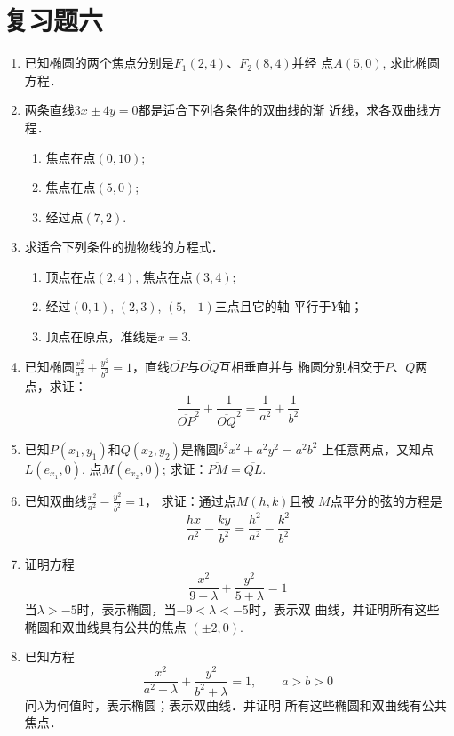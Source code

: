 \section*{复习题六}

\begin{enumerate}
    \item 已知椭圆的两个焦点分别是$F_1(2,4)$、$F_2(8,4)$并经
    点$A(5,0)$, 求此椭圆方程．
    \item 两条直线$3x\pm 4y=0$都是适合下列各条件的双曲线的渐
    近线，求各双曲线方程．
\begin{enumerate}
\item 焦点在点$(0,10)$;
\item 焦点在点$(5,0)$;
\item 经过点$(7,2)$.
\end{enumerate}

    \item 求适合下列条件的抛物线的方程式．
\begin{enumerate}
    \item 顶点在点$(2,4)$, 焦点在点$(3,4)$;
    \item 经过$(0,1)$, $(2,3)$, $(5,-1)$三点且它的轴
    平行于$Y$轴；
\item     顶点在原点，准线是$x=3$.
\end{enumerate}

\item    已知椭圆$\frac{x^2}{a^2}+\frac{y^2}{b^2}=1$，直线$\overline{OP}$与$\overline{OQ}$互相垂直并与
椭圆分别相交于$P$、$Q$两点，求证：
\[\frac{1}{\overline{OP}^2}+\frac{1}{\overline{OQ}^2}=\frac{1}{a^2}+\frac{1}{b^2}\]
\item    已知$P(x_1,y_1)$和$Q(x_2,y_2)$是椭圆$b^2x^2+a^2y^2=a^2b^2$
上任意两点，又知点$L(e_{x_1},0)$, 点$M(e_{x_2},0)$; 
求证：$\overline{PM}=\overline{QL}$.
\item    已知双曲线$\frac{x^2}{a^2}-\frac{y^2}{b^2}=1$，
求证：通过点$M(h,k)$且被
$M$点平分的弦的方程是
\[\frac{hx}{a^2}-\frac{ky}{b^2}=\frac{h^2}{a^2}-\frac{k^2}{b^2}\]
\item    证明方程
\[\frac{x^2}{9+\lambda}+\frac{y^2}{5+\lambda}=1\]
当$\lambda>-5$时，表示椭圆，当$-9<\lambda<-5$时，表示双
曲线，并证明所有这些椭圆和双曲线具有公共的焦点
$(\pm 2,0)$.
\item    已知方程
\[\frac{x^2}{a^2+\lambda}+\frac{y^2}{b^2+\lambda}=1,\qquad  a>b>0\]
问$\lambda$为何值时，表示椭圆；表示双曲线．并证明
所有这些椭圆和双曲线有公共焦点．


\end{enumerate}
